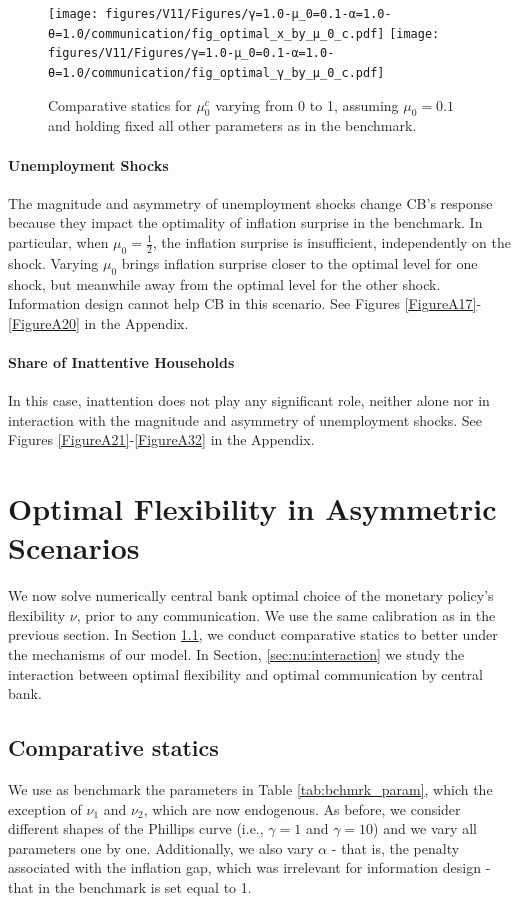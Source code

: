 \documentclass[12pt,a4paper]{article}
\begin{document}
 \begin{figure}[htp!]
    \centering
    \texttt{[image: figures/V11/Figures/γ=1.0-μ\_0=0.1-α=1.0-θ=1.0/communication/fig\_optimal\_x\_by\_μ\_0\_c.pdf]}
    \texttt{[image: figures/V11/Figures/γ=1.0-μ\_0=0.1-α=1.0-θ=1.0/communication/fig\_optimal\_γ\_by\_μ\_0\_c.pdf]}
    \caption{Comparative statics for $\mu_0^c$ varying from 0 to 1, assuming $\mu_0=0.1$ and holding fixed all other parameters as in the benchmark.}
    \label{Figure4new}
\end{figure}



\paragraph{Unemployment Shocks}
The magnitude and asymmetry of unemployment shocks change CB's response because they impact the optimality of inflation surprise in the benchmark. In particular, when $\mu_0=\frac{1}{2}$, the inflation surprise is insufficient, independently on the shock. Varying $\mu_0$ brings inflation surprise closer to the optimal level for one shock, but meanwhile away from the optimal level for the other shock. Information design cannot help CB in this scenario. See Figures \ref{FigureA17}-\ref{FigureA20} in the Appendix.


\paragraph{Share of Inattentive Households}
\label{sec:nu}
In this case, inattention does not play any significant role, neither alone nor in interaction with the magnitude and asymmetry of unemployment shocks. See Figures \ref{FigureA21}-\ref{FigureA32} in the Appendix.

\section{Optimal Flexibility in Asymmetric Scenarios} 
We now solve numerically central bank optimal choice of the monetary policy's flexibility $\nu$, prior to any communication. We use the same calibration as in the previous section. In Section \ref{sec:nu:compare}, we conduct comparative statics to better under the mechanisms of our model. In Section, \ref{sec:nu:interaction} we study the interaction between optimal flexibility and optimal communication by central bank.

\subsection{Comparative statics}
\label{sec:nu:compare}
We use as benchmark the parameters in Table \ref{tab:bchmrk_param}, which the exception of $\nu_1$ and $\nu_2$, which are now endogenous. As before, we consider different shapes of the Phillips curve (i.e., $\gamma=1$ and $\gamma=10$) and we vary all parameters one by one. Additionally, we also vary $\alpha$ - that is, the penalty associated with the inflation gap, which was irrelevant for information design - that in the benchmark is set equal to 1.
\end{document}
